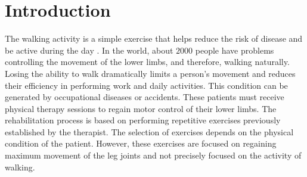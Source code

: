 
\section{Introduction}


The walking activity is a simple exercise that helps reduce the risk of disease and be active during the day \cite{lee2008importance}. In the world, about $2000$ people have problems controlling the movement of the lower limbs, and therefore, walking naturally. Losing the ability to walk dramatically limits a person's movement and reduces their efficiency in performing work and daily activities. This condition can be generated by occupational diseases or accidents. These patients must receive physical therapy sessions to regain motor control of their lower limbs. The rehabilitation process is based on performing repetitive exercises previously established by the therapist. The selection of exercises depends on the physical condition of the patient. However, these exercises are focused on regaining maximum movement of the leg joints and not precisely focused on the activity of walking.


